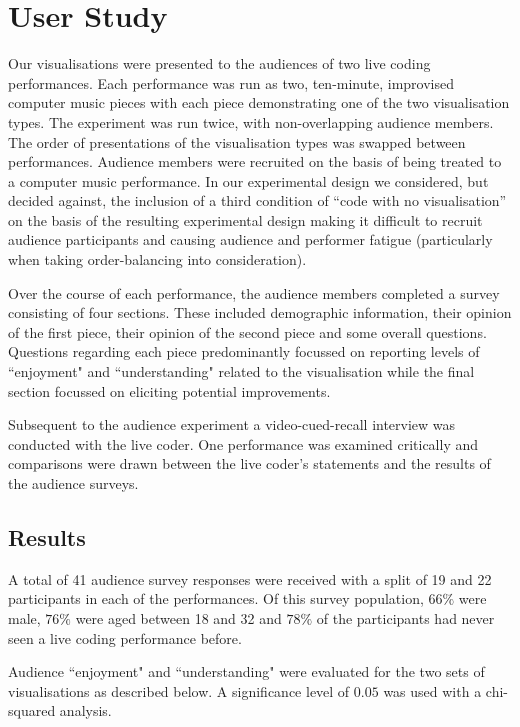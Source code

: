 \documentclass{sig-alternate}
\begin{document}
\section{User Study}

Our visualisations were presented to the audiences of two live coding performances. Each performance was run as two, ten-minute, improvised computer music pieces with each piece demonstrating one of the two visualisation types. The experiment was run twice, with non-overlapping audience members. The order of presentations of the visualisation types was swapped between performances. Audience members were recruited on the basis of being treated to a computer music performance. In our experimental design we considered, but decided against, the inclusion of a third condition of ``code with no visualisation'' on the basis of the resulting experimental design making it difficult to recruit audience participants and causing audience and performer fatigue (particularly when taking order-balancing into consideration). 

Over the course of each performance, the audience members completed a survey consisting of four sections. These included demographic information, their opinion of the first piece, their opinion of the second piece and some overall questions. Questions regarding each piece predominantly focussed on reporting levels of ``enjoyment" and ``understanding" related to the visualisation while the final section focussed on eliciting potential improvements.

Subsequent to the audience experiment a video-cued-recall interview was conducted with the live coder. One performance was examined critically and comparisons were drawn between the live coder's statements and the results of the audience surveys.

\subsection{Results}

A total of 41 audience survey responses were received with a split of 19 and 22 participants in each of the performances. Of this survey population, $66\%$ were male, $76\%$ were aged between 18 and 32 and $78\%$ of the participants had never seen a live coding performance before.

Audience ``enjoyment" and ``understanding" were evaluated for the two sets of visualisations as described below. A significance level of $0.05$ was used with a chi-squared analysis.
\end{document}
